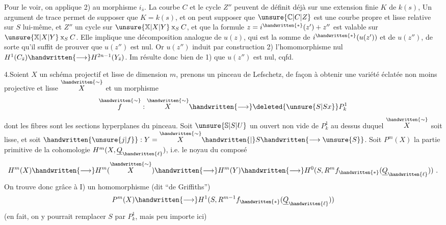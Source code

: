 Pour le voir, on applique 2) au morphisme $i_{\bar s}$. La courbe $C$ et le cycle $Z''$ peuvent de définit déjà sur une extension finie $K$ de $k(s)$, Un argument de trace permet de supposer que $K=k(s)$, et  on peut supposer que $\unsure{\mathbb{C}|C|Z}$  est une courbe propre et lisse relative sur $S$ lui-même, et $Z''$ un cycle sur $\unsure{\mathbb{X}|X|Y}\mathbin{\mathrm{x}}_S C$,  et que la formule $z=i^{\handwritten{*}}(z')+z''$ est valable sur $\unsure{\mathbb{X}|X|Y}\mathbin{\mathrm{x}}_S C$. Elle implique une décomposition analogue de $u(z)$, qui est la somme de $i^{\handwritten{*}}(u(z'))$ et de $u(z'')$, de sorte qu'il suffit de prouver que $u(z'')$ est nul. Or $u(z'')$ induit par construction 2) l'homomorphisme nul $H^1(C_{\bar s})\handwritten{\longrightarrow}H^{2n-1}(Y_{\bar s})$. Im résulte donc bien de 1) que $u(z'')$ est nul, cqfd.

4.\quad Soient $X$ un schéma projectif et lisse de dimension $m$, prenons un pinceau de Lefschetz, de façon à obtenir une variété éclatée non moins projective et lisse $\overset{\handwritten{\sim}}{X}$ et un morphisme
\[
\overset{\handwritten{\sim}}{f}:\overset{\handwritten{\sim}}{X}\handwritten{\longrightarrow}\deleted{\unsure{S|Sx}}P^1_k
\]
dont les fibres sont les sections hyperplanes du pinceau. Soit $\unsure{\mathbb{S}|S|U}$ un ouvert non vide de $P^1_k$ au dessus duquel $\overset{\handwritten{\sim}}{X}$ soit lisse, et soit $\handwritten{\unsure{j|f}}:Y=\overset{\handwritten{\sim}}{X}\handwritten{|}S\handwritten{\longrightarrow\unsure{S}}$.
Soit $P^m(X)$ la partie primitive de la cohomologie $H^m(X,\underline{Q}_{\handwritten{\ell}})$, i.e. le noyau du composé
\[
H^m(X)\handwritten{\longrightarrow}H^m(\overset{\handwritten{\sim}}{X})\handwritten{\longrightarrow}H^m(Y)\handwritten{\longrightarrow}H^0(S,R^m f_{\handwritten{*}}(\underline{Q}_{\handwritten{\ell}}))\ .
\]
On trouve donc grâce à I) un homomorphisme (dit ``de Griffiths'')
\[
P^m(X)\handwritten{\longrightarrow}H^1(S,R^{m-1}f_{\handwritten{*}}(\underline{Q}_{\handwritten{\ell}}))
\]
(en fait, on y pourrait remplacer $S$ par $P^1_k$, mais  peu importe ici)

